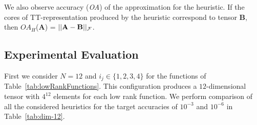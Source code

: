 \documentclass[runningheads]{llncs}
\newcommand{\tensor}[1]{\cal\textbf{#1}\xspace}
\begin{document}
\noindent We also observe accuracy (\textit{OA}) of the approximation for the heuristic. If the cores of TT-representation produced by the heuristic correspond to tensor \tensor{B}, then $OA_H$(\tensor{A}) = $||\tensor{A}-\tensor{B}||_F$.


\subsection{Experimental Evaluation}
First we consider $N=12$ and $i_j \in \{1, 2, 3, 4\}$ for the functions of Table~\ref{tab:lowRankFunctions}. This configuration produces a $12$-dimensional tensor with $4^{12}$ elements for each low rank function. We perform comparison of all the considered heuristics for the target accuracies of $10^{-3}$ and $10^{-6}$ in Table~\ref{tab:dim-12}. 
\end{document}
